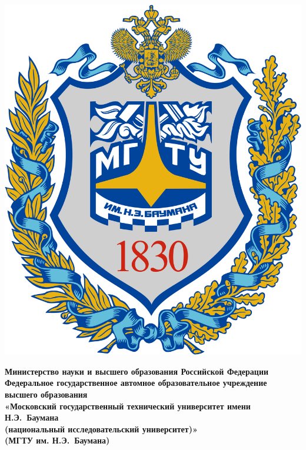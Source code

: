 \begin{titlepage}
	\thispagestyle{empty}
	\fontsize{12pt}{12pt}\selectfont
	\noindent \begin{minipage}{0.14\textwidth}
		\includegraphics[width=\linewidth]{img/b_logo.png}
	\end{minipage}
	\noindent\begin{minipage}{0.9\textwidth}\centering
		\textbf{Министерство науки и высшего образования Российской Федерации}\\
		\textbf{Федеральное государственное автомное образовательное учреждение высшего образования}\\
		\textbf{«Московский государственный технический университет имени Н.Э.~Баумана}\\
		\textbf{(национальный исследовательский университет)»}\\
		\textbf{(МГТУ им. Н.Э.~Баумана)}
	\end{minipage}
	
	\begin{center}
		\fontsize{12pt}{0.17\baselineskip}\selectfont
		\noindent\makebox[\linewidth]{\rule{\textwidth}{4pt}} \makebox[\linewidth]{\rule{\textwidth}{1pt}}
	\end{center}
	

\end{titlepage}

